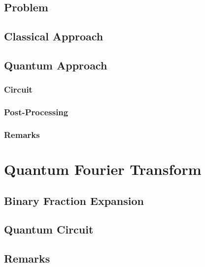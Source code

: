		\subsection{Problem} %

		\subsection{Classical Approach} %

		\subsection{Quantum Approach} %

			\subsubsection{Circuit} %

			\subsubsection{Post-Processing} %

			\subsubsection{Remarks} %

	\section{Quantum Fourier Transform} %

		\subsection{Binary Fraction Expansion} %

		\subsection{Quantum Circuit} %

		\subsection{Remarks} %

